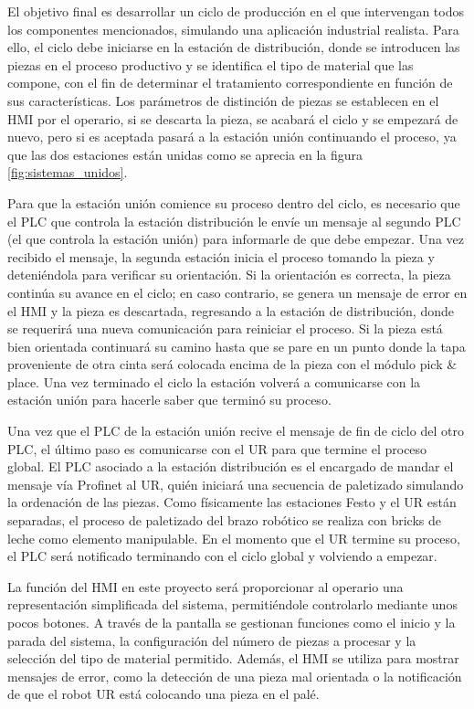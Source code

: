El objetivo final es desarrollar un ciclo de producción en el que intervengan todos los componentes mencionados, simulando una aplicación industrial realista. Para ello, el ciclo debe iniciarse en la estación de distribución, donde se introducen las piezas en el proceso productivo y se identifica el tipo de material que las compone, con el fin de determinar el tratamiento correspondiente en función de sus características. Los parámetros de distinción de piezas se establecen en el HMI por el operario, si se descarta la pieza, se acabará el ciclo y se empezará de nuevo, pero si es aceptada pasará a la estación unión continuando el proceso, ya que las dos estaciones están unidas como se aprecia en la figura \ref{fig:sistemas_unidos}. 

Para que la estación unión comience su proceso dentro del ciclo, es necesario que el PLC que controla la estación distribución le envíe un mensaje al segundo PLC (el que controla la estación unión) para informarle de que debe empezar.  Una vez recibido el mensaje, la segunda estación inicia el proceso tomando la pieza y deteniéndola para verificar su orientación. Si la orientación es correcta, la pieza continúa su avance en el ciclo; en caso contrario, se genera un mensaje de error en el HMI y la pieza es descartada, regresando a la estación de distribución, donde se requerirá una nueva comunicación para reiniciar el proceso. Si la pieza está bien orientada continuará su camino hasta que se pare en un punto donde la tapa proveniente de otra cinta será colocada encima de la pieza con el módulo pick \& place. Una vez terminado el ciclo la estación volverá a comunicarse con la estación unión para hacerle saber que terminó su proceso.

Una vez que el PLC de la estación unión recive el mensaje de fin de ciclo del otro PLC, el último paso es comunicarse con el UR para que termine el proceso global. El PLC asociado a la estación distribución es el encargado de mandar el mensaje vía Profinet al UR, quién iniciará una secuencia de paletizado simulando la ordenación de las piezas. Como físicamente las estaciones Festo y el UR están separadas, el proceso de paletizado del brazo robótico se realiza con bricks de leche como elemento manipulable. En el momento que el UR termine su proceso, el PLC será notificado terminando con el ciclo global y volviendo a empezar.

La función del HMI en este proyecto será proporcionar al operario una representación simplificada del sistema, permitiéndole controlarlo mediante unos pocos botones. A través de la pantalla se gestionan funciones como el inicio y la parada del sistema, la configuración del número de piezas a procesar y la selección del tipo de material permitido. Además, el HMI se utiliza para mostrar mensajes de error, como la detección de una pieza mal orientada o la notificación de que el robot UR está colocando una pieza en el palé.

